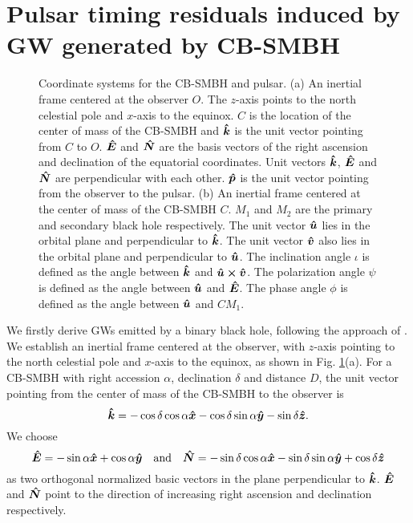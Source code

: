 \documentclass[times,tight]{aastex631}
\begin{document}
\section{Pulsar timing residuals induced by GW generated by CB-SMBH \label{sec:model}}
\begin{figure}
    \caption{Coordinate systems for the CB-SMBH and pulsar.
    (a) An inertial frame centered at the observer $O$.
    The $z$-axis points to the north celestial pole and $x$-axis to the equinox.
    $C$ is the location of the center of mass of the CB-SMBH and $\vu*{k}$ is the unit vector pointing from $C$ to $O$.
    $\vu*{E}$ and $\vu*{N}$ are the basis vectors of the right ascension and declination of the equatorial coordinates.
    Unit vectors $\vu*{k}$, $\vu*{E}$ and $\vu*{N}$ are perpendicular with each other.
    $\vu*{p}$ is the unit vector pointing from the observer to the pulsar.
    (b) An inertial frame centered at the center of mass of the CB-SMBH $C$.
    $M_1$ and $M_2$ are the primary and secondary black hole respectively.
    The unit vector $\vu*{u}$ lies in the orbital plane and perpendicular to $\vu*{k}$.
    The unit vector $\vu*{v}$ also lies in the orbital plane and perpendicular to $\vu*{u}$.
    The inclination angle $\iota$ is defined as the angle between $\vu*{k}$ and $\vu*{u} \cp \vu*{v}$.
    The polarization angle $\psi$ is defined as the angle between $\vu*{u}$ and $\vu*{E}$.
    The phase angle $\phi$ is defined as the angle between $\vu*{u}$ and $CM_1$.
    \label{fig:BBH}}
\end{figure}

We firstly derive GWs emitted by a binary black hole, following the approach of \cite{wahlquist1987}.
We establish an inertial frame centered at the observer, with $z$-axis pointing to the north celestial pole and $x$-axis to the equinox, as shown in Fig. \ref{fig:BBH}(a).
For a CB-SMBH with right accession $\alpha$, declination $\delta$ and distance $D$, the unit vector pointing from the center of mass of the CB-SMBH to the observer is 
\begin{equation}
    \vu*{k} = -\cos\delta\cos\alpha \vu*{x} - \cos\delta\sin\alpha \vu*{y} - \sin\delta\vu*{z}.
\end{equation}
We choose
\begin{equation}
    \vu*{E} = -\sin\alpha\vu*{x} + \cos\alpha\vu*{y} \qq{and}
    \vu*{N} = -\sin\delta\cos\alpha\vu*{x} - \sin\delta\sin\alpha\vu*{y} + \cos\delta\vu*{z}
\end{equation}
as two orthogonal normalized basic vectors in the plane perpendicular to $\vu*{k}$.
$\vu*{E}$ and $\vu*{N}$ point to the direction of increasing right ascension and declination respectively.
\end{document}
